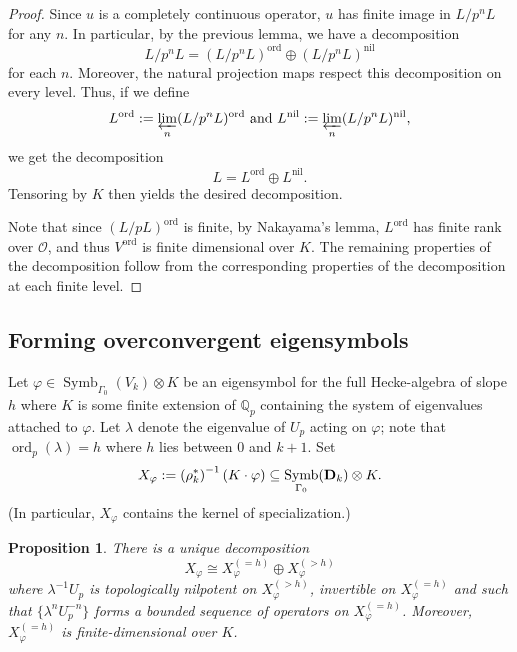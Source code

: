 \documentclass{amsart}
\theoremstyle{plain}
\newtheorem{prop}[thm]{Proposition}
\theoremstyle{definition}
\newcommand{\bD}{{\bf D}}
\renewcommand{\O}{{\mathcal O}}
\newcommand{\Q}{{\mathbb Q}}
\newcommand{\Qp}{\Q_p}
\renewcommand{\sp}{{\rho^*_k}}
\newcommand{\Dvrig}[1]{\bD_{#1}}
\newcommand{\Dkrig}{\Dvrig{k}}
\DeclareMathOperator{\ord}{ord}
\DeclareMathOperator{\Symb}{Symb}
\DeclareMathOperator{\nil}{nil}
\newcommand{\MSo}[1]{\Symb_{\Gamma_0}(#1)}
\begin{document}
\begin{proof}
Since $u$ is a completely continuous operator, $u$ has finite
image in $L / p^n L$ for any $n$.  In particular, by the previous
lemma, we have a decomposition
$$
L / p^n L = (L / p^n L)^{\ord} \oplus (L / p^n L)^{\nil}
$$
for each $n$.  Moreover, the natural projection maps respect this decomposition on every level.  Thus, if we define 
$$
L^{\ord} := \varprojlim_n (L / p^n L)^{\ord}
\text{~and~}
L^{\nil} := \varprojlim_n (L /
p^n L)^{\nil},
$$ 
we get the decomposition
$$
L  = L^{\ord} \oplus L^{\nil}.
$$
Tensoring by $K$ then yields the desired decomposition.  

Note that since $(L / p L)^{\ord}$ is finite, by Nakayama's lemma, $L^{\ord}$ has finite rank over $\O$, and thus $V^{\ord}$ is finite dimensional over $K$.  The remaining properties of the decomposition follow from the corresponding properties of the decomposition at each finite level.
\end{proof}




\subsection{Forming overconvergent eigensymbols}

Let $\varphi \in \MSo{V_k} \otimes K$ be an eigensymbol for the
full Hecke-algebra of slope $h$ where $K$ is some finite extension
of $\Qp$ containing the system of eigenvalues attached to
$\varphi$. Let $\lambda$ denote the eigenvalue of $U_p$
acting on $\varphi$; note that $\ord_p(\lambda) = h$ where $h$
lies between $0$ and $k+1$. Set
$$
X_\varphi := \left(\sp\right)^{-1}(K \cdot \varphi) \subseteq \MSo{\Dkrig}
\otimes K.
$$
(In particular, $X_\varphi$ contains the kernel of specialization.)

\begin{prop}
\label{prop:Xdecomp} There is a unique decomposition
$$
X_\varphi \cong X_\varphi^{(=h)} \oplus X_\varphi^{(>h)}
$$
where $\lambda^{-1} U_p$ is topologically nilpotent on $X_\varphi^{(>h)}$,
invertible on $X_\varphi^{(=h)}$ and such that $\{\lambda^n U_p^{-n} \}$
forms a bounded sequence of operators on $X_\varphi^{(=h)}$.  Moreover,
$X_\varphi^{(=h)}$ is finite-dimensional over $K$.
\end{prop}
\end{document}
